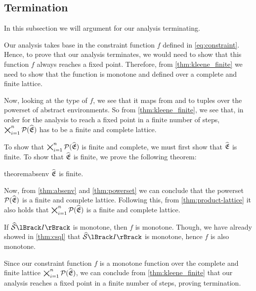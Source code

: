 \subsection{Termination}\label{subsec:termination}

In this subsection we will argument for our analysis terminating.

Our analysis takes base in the constraint function $f$ defined in \autoref{eq:constraint}.
Hence, to prove that our analysis terminates, we would need to show that this function $f$ always reaches a fixed point.
Therefore, from \autoref{thm:kleene_finite} we need to show that the function is monotone and defined over a complete and finite lattice.

Now, looking at the type of $f$, we see that it maps from and to tuples over the powerset of abstract environments.
So from \autoref{thm:kleene_finite}, we see that, in order for the analysis to reach a fixed point in a finite number of steps, $\bigtimes_{i = 1}^n \mathcal{P}(\widehat{\mathfrak{E}})$ has to be a finite and complete lattice.

To show that $\bigtimes_{i = 1}^n \mathcal{P}(\widehat{\mathfrak{E}})$ is finite and complete, we must first show that $\widehat{\mathfrak{E}}$ is finite.
To show that $\widehat{\mathfrak{E}}$ is finite, we prove the following theorem:

\begin{restatable}{theorem}{absenv}\label{thm:absenv}
$\widehat{\mathfrak{E}}$ is finite.
\end{restatable}

Now, from \autoref{thm:absenv} and \autoref{thm:powerset} we can conclude that the powerset $\mathcal{P}(\widehat{\mathfrak{E}})$ is a finite and complete lattice.
Following this, from \autoref{thm:product-lattice} it also holds that $\bigtimes_{i = 1}^n \mathcal{P}(\widehat{\mathfrak{E}})$ is a finite and complete lattice.

If $\abssem{I}$ is monotone, then $f$ is monotone.
Though, we have already showed in \autoref{thm:csql} that $\abssem{I}$ is monotone, hence $f$ is also monotone.

Since our constraint function $f$ is a monotone function over the complete and finite lattice $\bigtimes_{i = 1}^n \mathcal{P}(\widehat{\mathfrak{E}})$, we can conclude from \autoref{thm:kleene_finite} that our analysis reaches a fixed point in a finite number of steps, proving termination.
